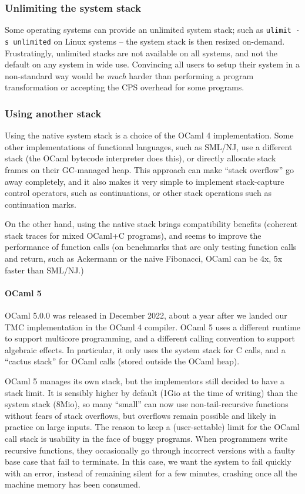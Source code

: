 \subsubsection{Unlimiting the system stack}

Some operating systems can provide an unlimited system stack; such as \texttt{ulimit -s unlimited} on Linux systems -- the system stack is then resized on-demand.
Frustratingly, unlimited stacks are not available on all systems, and not the default on any system in wide use.
Convincing all users to setup their system in a non-standard way would be \emph{much} harder than performing a program transformation or accepting the CPS overhead for some programs.

\subsubsection{Using another stack}

Using the native system stack is a choice of the OCaml 4 implementation.
Some other implementations of functional languages, such as SML/NJ, use a different stack (the OCaml bytecode interpreter does this), or directly allocate stack frames on their GC-managed heap.
This approach can make ``stack overflow'' go away completely, and it also makes it very simple to implement stack-capture control operators, such as continuations, or other stack operations such as continuation marks.

On the other hand, using the native stack brings compatibility benefits (coherent stack traces for mixed OCaml+C programs), and seems to improve the performance of function calls (on benchmarks that are only testing function calls and return, such as Ackermann or the naive Fibonacci, OCaml can be 4x, 5x faster than SML/NJ.)

\paragraph{OCaml 5}

OCaml 5.0.0 was released in December 2022, about a year after we landed our TMC implementation in the OCaml 4 compiler.
OCaml 5 uses a different runtime to support multicore programming, and a different calling convention to support algebraic effects.
In particular, it only uses the system stack for C calls, and a ``cactus stack'' for OCaml calls (stored outside the OCaml heap).

OCaml 5 manages its own stack, but the implementors still decided to have a stack limit.
It is sensibly higher by default (1Gio at the time of writing) than the system stack (8Mio), so many ``small'' can now use non-tail-recursive functions without fears of stack overflows, but overflows remain possible and likely in practice on large inputs.
The reason to keep a (user-settable) limit for the OCaml call stack is usability in the face of buggy programs.
When programmers write recursive functions, they occasionally go through incorrect versions with a faulty base case that fail to terminate.
In this case, we want the system to fail quickly with an error, instead of remaining silent for a few minutes, crashing once all the machine memory has been consumed.

